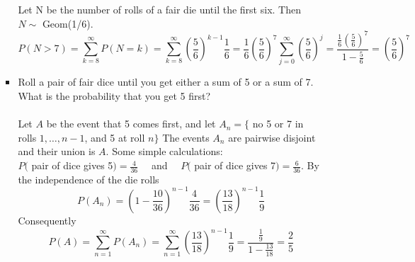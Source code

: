 \documentclass{report}
\begin{document}
\begin{itemize}
\begin{itemize}
\begin{itemize}
          Let N be the number of rolls of a fair die until the first six. Then $N \sim$ Geom(1/6).
      \[
          P(N>7) = \sum_{k=8}^{\infty} P(N=k)
          = \sum_{k=8}^{\infty}(\frac{5}{6})^{k-1} \frac{1}{6}
          =\frac{1}{6} (\frac{5}{6}) ^7 \sum_{j=0}^{\infty}(\frac{5}{6})^j
          =\frac{\frac{1}{6} (\frac{5}{6} )^7}{1-\frac{5}{6}}
          =(\frac{5}{6})^7
        \]
    \item Roll a pair of fair dice until you get either a sum of 5 or a sum of 7. What is the probability that you get 5 first?\\\\
      Let $A$ be the event that 5 comes first, and let
      $A_n=\{$ no 5 or 7 in rolls $1, \ldots, n-1$, and 5 at roll $n\}$
      The events $A_n$ are pairwise disjoint and their union is $A$. Some simple calculations:\\
      $P($ pair of dice gives 5$)=\frac{4}{36} \quad$ and $\quad P($ pair of dice gives 7$)=\frac{6}{36}$.
      By the independence of the die rolls
      $$
      P\left(A_n\right)=\left(1-\frac{10}{36}\right)^{n-1} \frac{4}{36}=\left(\frac{13}{18}\right)^{n-1} \frac{1}{9}
      $$
      Consequently
      \[
        P(A)=\sum_{n=1}^{\infty} P\left(A_n\right)
            =\sum_{n=1}^{\infty}\left(\frac{13}{18}\right)^{n-1} \frac{1}{9}
            =\frac{\frac{1}{9}}{1-\frac{13}{18}}
            =\frac{2}{5}
      \]
      \end{itemize}
    \end{itemize}
  \end{itemize}
\end{document}
